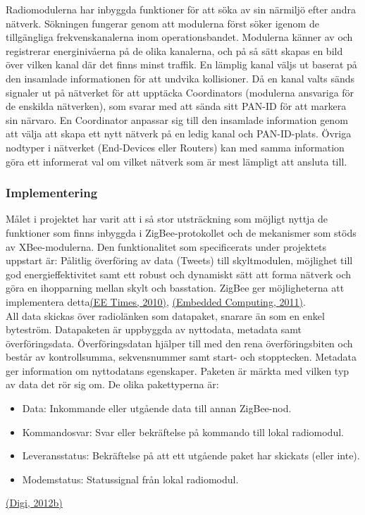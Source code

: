 \documentclass[a4paper,11pt]{article}
\begin{document}
Radiomodulerna har inbyggda funktioner för att söka av sin närmiljö efter andra nätverk. Sökningen fungerar genom att modulerna först söker igenom de tillgängliga frekvenskanalerna inom operationsbandet. Modulerna känner av och registrerar energinivåerna på de olika kanalerna, och på så sätt skapas en bild över vilken kanal där det finns minst traffik. En lämplig kanal väljs ut baserat på den insamlade informationen för att undvika kollisioner. Då en kanal valts sänds signaler ut på nätverket för att upptäcka Coordinators (modulerna ansvariga för de enskilda nätverken), som svarar med att sända sitt PAN-ID för att markera sin närvaro. En Coordinator anpassar sig till den insamlade information genom att välja att skapa ett nytt nätverk på en ledig kanal och PAN-ID-plats. Övriga nodtyper i nätverket (End-Devices eller Routers) kan med samma information göra ett informerat val om vilket nätverk som är mest lämpligt att ansluta till.

\subsubsection{Implementering}
Målet i projektet har varit att i så stor utsträckning som möjligt nyttja de funktioner som finns inbyggda i ZigBee-protokollet och de mekanismer som stöds av XBee-modulerna.
Den funktionalitet som specificerats under projektets uppstart är: Pålitlig överföring av data (Tweets) till skyltmodulen, möjlighet till god energieffektivitet samt ett robust och dynamiskt sätt att forma nätverk och göra en ihopparning mellan skylt och basstation. ZigBee ger möjligheterna att implementera detta\hyperref[eetimes]{(EE Times, 2010)},  \hyperref[embedded]{(Embedded Computing, 2011)}. \\

All data skickas över radiolänken som datapaket, snarare än som en enkel byteström. Datapaketen är uppbyggda av nyttodata, metadata samt överföringsdata. Överföringsdatan hjälper till med den rena överföringsbiten och består av kontrollsumma, sekvensnummer samt start- och stopptecken. Metadata ger information om nyttodatans egenskaper.
Paketen är märkta med vilken typ av data det rör sig om. De olika pakettyperna är:

	\begin{itemize}
    	\item Data: Inkommande eller utgående data till annan ZigBee-nod.
    	\item Kommandosvar: Svar eller bekräftelse på kommando till lokal radiomodul.
    	\item Leveransstatus: Bekräftelse på att ett utgående paket har skickats (eller inte).
    	\item Modemstatus: Statussignal från lokal radiomodul.
    	\end{itemize}
\hyperref[digi]{(Digi, 2012b)}
\end{document}
